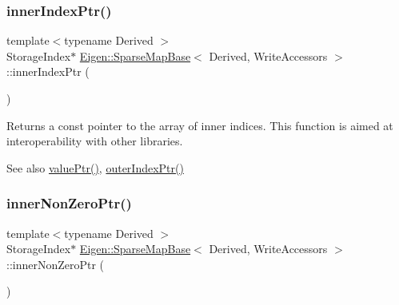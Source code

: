 \subsubsection{\texorpdfstring{innerIndexPtr()}{innerIndexPtr()}}
{\footnotesize\ttfamily template$<$typename Derived $>$ \\
Storage\+Index$\ast$ \mbox{\hyperlink{class_eigen_1_1_sparse_map_base}{Eigen\+::\+Sparse\+Map\+Base}}$<$ Derived, Write\+Accessors $>$\+::inner\+Index\+Ptr (\begin{DoxyParamCaption}{ }\end{DoxyParamCaption})\hspace{0.3cm}{\ttfamily [inline]}}





\begin{DoxyReturn}{Returns}
a const pointer to the array of inner indices. This function is aimed at interoperability with other libraries. 
\end{DoxyReturn}
\begin{DoxySeeAlso}{See also}
\mbox{\hyperlink{class_eigen_1_1_sparse_map_base_3_01_derived_00_01_write_accessors_01_4_af91648a18729ae8ff29cb1d8751c5655}{value\+Ptr()}}, \mbox{\hyperlink{class_eigen_1_1_sparse_map_base_3_01_derived_00_01_write_accessors_01_4_a3b74af754254837fc591cd9936688b95}{outer\+Index\+Ptr()}} 
\end{DoxySeeAlso}
\mbox{\label{class_eigen_1_1_sparse_map_base_3_01_derived_00_01_write_accessors_01_4_af877ea4e285a4497f80987fea66f7459}} 
\subsubsection{\texorpdfstring{innerNonZeroPtr()}{innerNonZeroPtr()}}
{\footnotesize\ttfamily template$<$typename Derived $>$ \\
Storage\+Index$\ast$ \mbox{\hyperlink{class_eigen_1_1_sparse_map_base}{Eigen\+::\+Sparse\+Map\+Base}}$<$ Derived, Write\+Accessors $>$\+::inner\+Non\+Zero\+Ptr (\begin{DoxyParamCaption}{ }\end{DoxyParamCaption})\hspace{0.3cm}{\ttfamily [inline]}}






